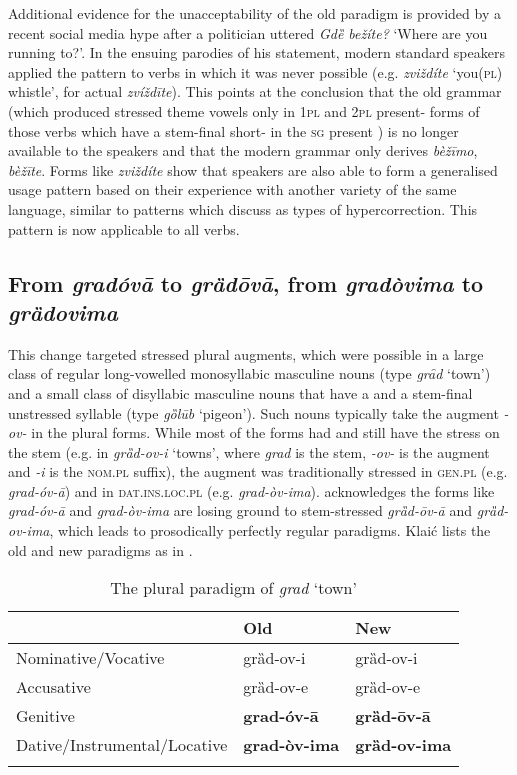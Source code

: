 \documentclass[output=paper,nonflat,colorlinks,citecolor=brown,newtxmath]{langsci/langscibook}
\begin{document}
Additional evidence for the unacceptability of the old paradigm is provided by a recent social media hype after a  politician uttered \textit{Gdȅ bežíte?} `Where are you running to?'. In the ensuing parodies of his statement, modern standard speakers applied the pattern to verbs in which it was never possible (e.g. \textit{zviždíte} `you(\textsc{pl}) whistle', for actual \textit{zvíždīte}). This points at the conclusion that the old grammar (which produced stressed theme vowels only in 1\textsc{pl} and 2\textsc{pl} present- forms of those verbs which have a stem-final short- in the \textsc{sg}  present ) is no longer available to the speakers and that the modern  grammar only derives \textit{bèžīmo}, \textit{bèžīte}. Forms like \textit{zviždíte} show that  speakers are also able to form a generalised usage pattern based on their experience with another variety of the same language, similar to patterns which \citet{Janda1994} discuss as types of hypercorrection. This pattern is now applicable to all verbs.
\subsection{From \textit{gradóvā} to \textit{grȁdōvā}, from \textit{gradòvima} to \textit{grȁdovima}} \label{sec:kager:subsec23}

This change targeted stressed plural augments, which were possible in a large class of regular long-vowelled monosyllabic masculine nouns (type \textit{grȃd} `town’) and a small class of disyllabic masculine nouns that have a  and a stem-final unstressed syllable (type \textit{gȍlūb} `pigeon’). Such nouns typically take the augment \textit{-ov-} in the plural forms. While most of the forms had and still have the stress on the stem (e.g. in \textit{grȁd-ov-i} `towns', where \textit{grad} is the stem, \textit{-ov-} is the augment and \textit{-i} is the \textsc{nom}.\textsc{pl} suffix), the augment was traditionally stressed in \textsc{gen}.\textsc{pl} (e.g. \textit{grad-óv-ā}) and in \textsc{dat}.\textsc{ins}.\textsc{loc}.\textsc{pl} (e.g. \textit{grad-òv-ima}). \citet[19--20]{Klaic2013} acknowledges the forms like \textit{grad-óv-ā} and \textit{grad-òv-ima} are losing ground to stem-stressed \textit{grȁd-ōv-ā} and \textit{grȁd-ov-ima}, which leads to prosodically perfectly regular paradigms.  Klaić lists the old and new paradigms as in  .

\begin{table}
\caption{The plural paradigm of \textit{grad} `town'}
\label{tab:kager:4}
 \begin{tabular}{  l  l  l }
 \lsptoprule
& Old & New\\
 \midrule
  Nominative/Vocative  &  grȁd-ov-i  &   grȁd-ov-i\\
  Accusative  &  grȁd-ov-e &grȁd-ov-e\\
Genitive  &  \textbf{grad-óv-ā}& \textbf{grȁd-ōv-ā}\\
Dative/Instrumental/Locative  & \textbf{grad-òv-ima}& \textbf{grȁd-ov-ima}\\
  \lspbottomrule
 \end{tabular}
\end{table}
\end{document}
